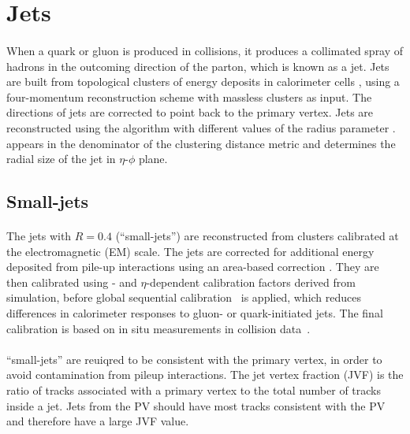 \section{Jets}
\paragraph{}
When a quark or gluon is produced in collisions, it produces a collimated spray of hadrons in the outcoming direction of the parton, which is known as a jet. 
Jets are built from topological clusters of energy deposits in calorimeter cells \cite{PERF-2014-07}, using a four-momentum reconstruction scheme with massless clusters as input. 
The directions of jets are corrected to point back to the primary vertex. 
Jets are reconstructed using the \akt algorithm with different values of the radius parameter \R. \R appears in the denominator of the clustering distance metric and determines the radial size of the jet in $\eta$-$\phi$ plane.

\subsection{Small-\R jets}
\paragraph{}
 The jets with $R=0.4$ (``small-\R jets'') are reconstructed from clusters calibrated at the electromagnetic (EM) scale. The jets are corrected for additional energy deposited from pile-up interactions using an area-based correction \cite{Cacciari:2008gn}. 
 They are then calibrated using \pt- and $\eta$-dependent calibration factors derived from simulation, before global sequential calibration~\cite{Aad:2011he} is applied, which reduces differences in calorimeter responses to gluon- or quark-initiated jets. 
 The final calibration is based on in situ measurements in collision data~\cite{ATL-PHYS-PUB-2015-015}.

 \paragraph{}
 ``small-\R jets'' are reuiqred to be consistent with the primary vertex, in order to avoid contamination from pileup interactions. 
 The jet vertex fraction (JVF) is the ratio of tracks associated with a primary vertex to the total number of tracks inside a jet. 
 Jets from the PV should have most tracks consistent with the PV and therefore have a large JVF value.

